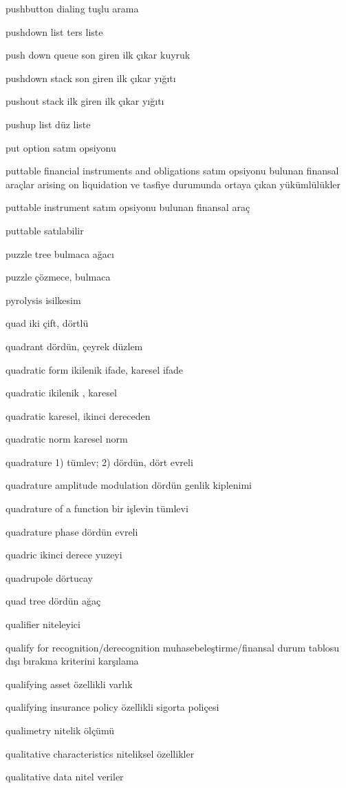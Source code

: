 \documentclass[12pt,fleqn]{article}\usepackage{../../common}
\begin{document}
pushbutton dialing tuşlu arama

pushdown list ters liste

push down queue son giren ilk çıkar kuyruk

pushdown stack son giren ilk çıkar yığıtı

pushout stack ilk giren ilk çıkar yığıtı

pushup list düz liste

put option satım opsiyonu

puttable financial instruments and obligations satım opsiyonu bulunan finansal araçlar arising on liquidation ve tasfiye durumunda ortaya çıkan yükümlülükler

puttable instrument satım opsiyonu bulunan finansal araç

puttable satılabilir

puzzle tree bulmaca ağacı

puzzle çözmece, bulmaca

pyrolysis isilkesim

quad iki çift, dörtlü

quadrant dördün, çeyrek düzlem

quadratic form ikilenik ifade, karesel ifade

quadratic ikilenik , karesel

quadratic karesel, ikinci dereceden

quadratic norm karesel norm

quadrature 1) tümlev; 2) dördün, dört evreli

quadrature amplitude modulation dördün genlik kiplenimi

quadrature of a function bir işlevin tümlevi

quadrature phase dördün evreli

quadric ikinci derece yuzeyi

quadrupole dörtucay

quad tree dördün ağaç

qualifier niteleyici

qualify for recognition/derecognition muhasebeleştirme/finansal durum tablosu dışı bırakma kriterini karşılama

qualifying asset özellikli varlık

qualifying insurance policy özellikli sigorta poliçesi

qualimetry nitelik ölçümü

qualitative characteristics niteliksel özellikler

qualitative data nitel veriler
\end{document}
